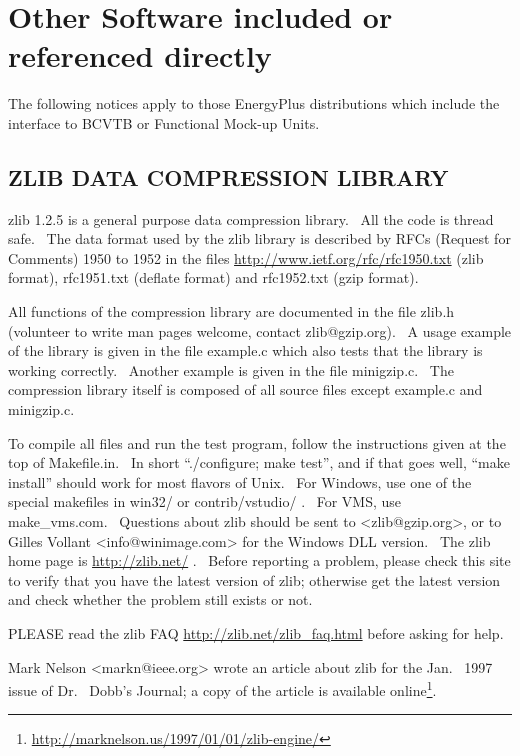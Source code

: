 \section{Other Software included or referenced directly}\label{other-software-included-or-referenced-directly}

The following notices apply to those EnergyPlus distributions which include the interface to BCVTB or Functional Mock-up Units.

\subsection{ZLIB DATA COMPRESSION LIBRARY}\label{zlib-data-compression-library}

zlib 1.2.5 is a general purpose data compression library.~ All the code is thread safe.~ The data format used by the zlib library is described by RFCs (Request for Comments) 1950 to 1952 in the files \url{http://www.ietf.org/rfc/rfc1950.txt} (zlib format), rfc1951.txt (deflate format) and rfc1952.txt (gzip format).

All functions of the compression library are documented in the file zlib.h (volunteer to write man pages welcome, contact zlib@gzip.org).~ A usage example of the library is given in the file example.c which also tests that the library is working correctly. ~Another example is given in the file minigzip.c.~ The compression library itself is composed of all source files except example.c and minigzip.c.

To compile all files and run the test program, follow the instructions given at the top of Makefile.in.~ In short ``./configure; make test'', and if that goes well, ``make install'' should work for most flavors of Unix.~ For Windows, use one of the special makefiles in win32/ or contrib/vstudio/ .~ For VMS, use make\_vms.com.~ Questions about zlib should be sent to \textless{}zlib@gzip.org\textgreater{}, or to Gilles Vollant \textless{}info@winimage.com\textgreater{} for the Windows DLL version.~ The zlib home page is \url{http://zlib.net/} .~ Before reporting a problem, please check this site to verify that you have the latest version of zlib; otherwise get the latest version and check whether the problem still exists or not.

PLEASE read the zlib FAQ \url{http://zlib.net/zlib_faq.html} before asking for help.

Mark Nelson \textless{}markn@ieee.org\textgreater{} wrote an article about zlib for the Jan.~ 1997 issue of Dr.~ Dobb's Journal; a copy of the article is available online\footnote{\url{http://marknelson.us/1997/01/01/zlib-engine/}}.

